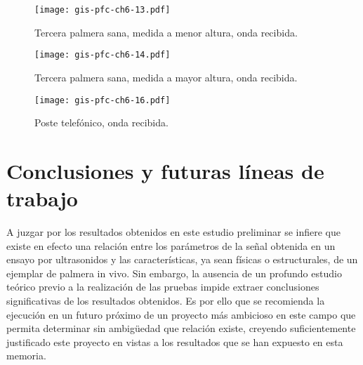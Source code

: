 \begin{figure}[p]
    \begin{center}
	\texttt{[image: gis-pfc-ch6-13.pdf]}
    \end{center}
    \caption[Tercera palmera sana (onda recibida)]{Tercera palmera sana,
    medida a menor altura, onda recibida.}
    \label{fig:palmera3a-recibida}
\end{figure}

\begin{figure}[p]
    \begin{center}
	\texttt{[image: gis-pfc-ch6-14.pdf]}
    \end{center}
    \caption[Tercera palmera sana (onda recibida)]{Tercera palmera sana,
    medida a mayor altura, onda recibida.}
    \label{fig:palmera3b-recibida}
\end{figure}

\begin{figure}[p]
    \begin{center}
	\texttt{[image: gis-pfc-ch6-16.pdf]}
    \end{center}
    \caption[Poste telefónico (onda recibida)]{Poste telefónico, onda
    recibida.}
    \label{fig:poste-recibida}
\end{figure}


\section{Conclusiones y futuras líneas de trabajo}

A juzgar por los resultados obtenidos en este estudio preliminar se infiere
que existe en efecto una relación entre los parámetros de la señal obtenida
en un ensayo por ultrasonidos y las características, ya sean físicas o
estructurales, de un ejemplar de palmera in vivo. Sin embargo, la ausencia
de un profundo estudio teórico previo a la realización de las pruebas
impide extraer conclusiones significativas de los resultados obtenidos. Es
por ello que se recomienda la ejecución en un futuro próximo de un proyecto
más ambicioso en este campo que permita determinar sin ambigüedad que
relación existe, creyendo suficientemente justificado este proyecto en
vistas a los resultados que se han expuesto en esta memoria.
